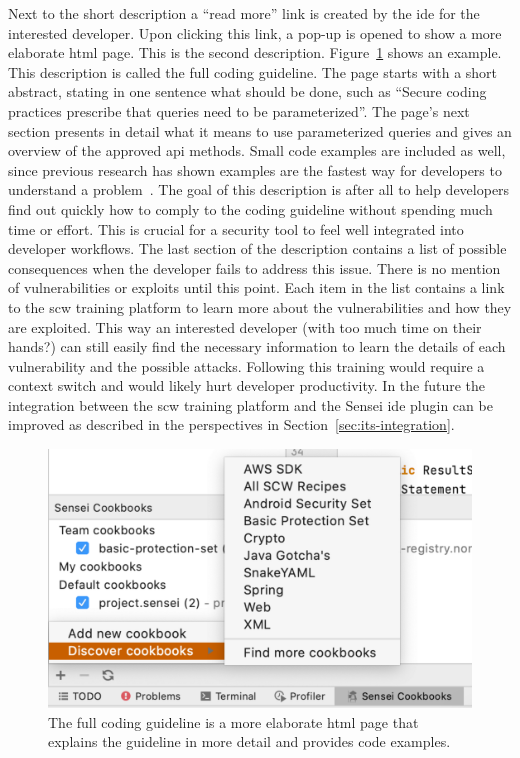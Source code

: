 Next to the short description a “read more” link is created by the \gls{ide} for the interested developer.
Upon clicking this link, a pop-up is opened to show a more elaborate \gls{html} page.
This is the second description.
Figure~\ref{fig:fulldescription} shows an example.
This description is called the full coding guideline.
The page starts with a short abstract, stating in one sentence what should be done, such as “Secure coding practices prescribe that queries need to be parameterized”.
The page's next section presents in detail what it means to use parameterized queries and gives an overview of the approved \gls{api} methods.
Small code examples are included as well, since previous research has shown examples are the fastest way for developers to understand a problem~\cite{whitney2018embedding}.
The goal of this description is after all to help developers find out quickly how to comply to the coding guideline without spending much time or effort.
This is crucial for a security tool to feel well integrated into developer workflows.
The last section of the description contains a list of possible consequences when the developer fails to address this issue.
There is no mention of vulnerabilities or exploits until this point.
Each item in the list contains a link to the \gls{scw} training platform to learn more about the vulnerabilities and how they are exploited.
This way an interested developer (with too much time on their hands?) can still easily find the necessary information to learn the details of each vulnerability and the possible attacks.
Following this training would require a context switch and would likely hurt developer productivity.
In the future the integration between the \gls{scw} training platform and the Sensei \gls{ide} plugin can be improved as described in the perspectives in Section~\ref{sec:its-integration}.

\begin{figure}
  \centering
  \includegraphics[width=\textwidth,page=7]{04-tools/figures/figures1.pdf}
  \caption[Example of the full coding guideline.]{The full coding guideline is a more elaborate \gls{html} page that explains the guideline in more detail and provides code examples.}
  \label{fig:fulldescription}
\end{figure}

